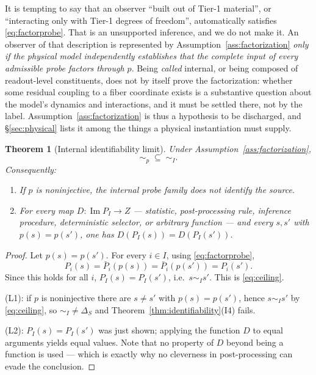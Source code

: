 \documentclass[11pt,reqno]{amsart}
\theoremstyle{plain}
\newtheorem{theorem}{Theorem}[section]
\theoremstyle{definition}
\theoremstyle{remark}
\DeclareMathOperator{\Ima}{Im}
\begin{document}
It is tempting to say that an observer ``built out of Tier-1 material'', or ``interacting only with Tier-1 degrees of freedom'', automatically satisfies \eqref{eq:factorprobe}. That is an unsupported inference, and we do not make it. An observer of that description is represented by Assumption~\ref{ass:factorization} \emph{only if the physical model independently establishes that the complete input of every admissible probe factors through $p$}. Being \emph{called} internal, or being composed of readout-level constituents, does not by itself prove the factorization: whether some residual coupling to a fiber coordinate exists is a substantive question about the model's dynamics and interactions, and it must be settled there, not by the label. Assumption~\ref{ass:factorization} is thus a hypothesis to be discharged, and \S\ref{sec:physical} lists it among the things a physical instantiation must supply.

\begin{theorem}[Internal identifiability limit]\label{thm:ceiling}
Under Assumption~\ref{ass:factorization},
\begin{equation}\label{eq:ceiling}
\sim_p\;\subseteq\;\sim_I .
\end{equation}
Consequently:
\begin{enumerate}
\item[(L1)] If $p$ is noninjective, the internal probe family does not identify the source.
\item[(L2)] For \emph{every} map $D\colon\Ima P_I\to Z$ --- statistic, post-processing rule, inference procedure, deterministic selector, or arbitrary function --- and every $s,s'$ with $p(s)=p(s')$, one has $D(P_I(s))=D(P_I(s'))$.
\end{enumerate}
\end{theorem}

\begin{proof}
Let $p(s)=p(s')$. For every $i\in I$, using \eqref{eq:factorprobe},
\[
P_i(s)=\bar P_i(p(s))=\bar P_i(p(s'))=P_i(s').
\]
Since this holds for all $i$, $P_I(s)=P_I(s')$, i.e.\ $s\sim_I s'$. This is \eqref{eq:ceiling}.

(L1): if $p$ is noninjective there are $s\neq s'$ with $p(s)=p(s')$, hence $s\sim_I s'$ by \eqref{eq:ceiling}, so $\sim_I\neq\Delta_S$ and Theorem~\ref{thm:identifiability}(I4) fails.

(L2): $P_I(s)=P_I(s')$ was just shown; applying the function $D$ to equal arguments yields equal values. Note that no property of $D$ beyond being a function is used --- which is exactly why no cleverness in post-processing can evade the conclusion.
\end{proof}
\end{document}
